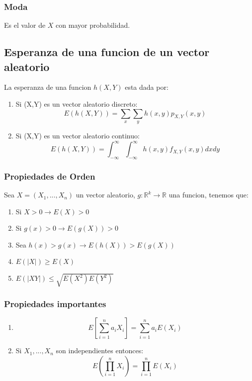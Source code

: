 \documentclass[titlepage,a4paper]{article}
\begin{document}
\subsubsection{Moda}
Es el valor de $X$ con mayor probabilidad.
\subsection{Esperanza de una funcion de un vector aleatorio}
La esperanza de una funcion $h(X,Y)$ esta dada por:
\begin{enumerate}
    \item Si (X,Y) es un vector aleatorio discreto:
    \begin{equation*}
        E(h(X,Y)) = \sum_{x} \sum_{y} h(x,y) p_{X,Y}(x,y)
    \end{equation*}
    \item Si (X,Y) es un vector aleatorio continuo:
    \begin{equation*}
        E(h(X,Y)) = \int_{-\infty}^{\infty} \int_{-\infty}^{\infty} h(x,y) f_{X,Y}(x,y) dxdy
    \end{equation*}
\end{enumerate}
\subsubsection{Propiedades de Orden}
Sea $X = (X_{1},...,X_{n})$ un vector aleatorio, $ g: \mathbb{R}^{k} \rightarrow \mathbb{R}$ una funcion, tenemos que:
\begin{enumerate}
    \item Si $X>0 \rightarrow E(X)>0$
    \item Si $g(x)>0 \rightarrow E(g(X))>0$
    \item Sea $ h(x)>g(x) \rightarrow E(h(X))> E(g(X)) $
    \item $E(|X|) \geq E(X)$
    \item $E(|XY|) \leq \sqrt{E(X^{2})E(Y^{2})} $
\end{enumerate}
\subsubsection{Propiedades importantes}
\begin{enumerate}
    \item \begin{equation*}
        E[\sum_{i=1}^{n}a_{i}X_{i}] = \sum_{i=1}^{n}a_{i}E(X_{i})
    \end{equation*}
    \item Si $X_{1},...,X_{n}$ son independientes entonces: \begin{equation*}
        E(\prod_{i=1}^{n}X_{i}) = \prod_{i=1}^{n}E(X_{i})
    \end{equation*}
\end{enumerate}
\end{document}
